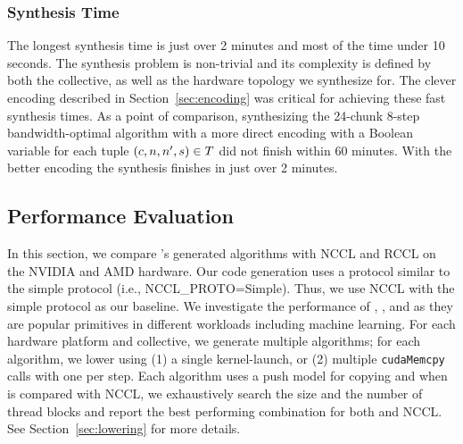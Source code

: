 \subsubsection{Synthesis Time}
The longest synthesis time is just over 2 minutes and most of the time
under 10 seconds.  The synthesis problem is non-trivial and its
complexity is defined by both the collective, as well as the hardware
topology we synthesize for. The clever encoding described in
Section~\ref{sec:encoding} was critical for achieving these fast
synthesis times. As a point of comparison, synthesizing the 24-chunk
8-step bandwidth-optimal \alltoall algorithm with a more direct
encoding with a Boolean variable for each tuple $(c, n, n', s) \in
T$ did not finish within 60 minutes. With the better encoding the
synthesis finishes in just over 2 minutes.

\subsection{Performance Evaluation}
In this section, we compare \tool's generated algorithms with NCCL and
RCCL on the NVIDIA and AMD hardware.  Our code generation uses a
protocol similar to the simple protocol (i.e., NCCL\_PROTO=Simple).
Thus, we use NCCL with the simple protocol as our baseline. We
investigate the performance of \allgather, \allreduce, and \alltoall
as they are popular primitives in different workloads including
machine learning. For each hardware platform and collective, we
generate multiple algorithms; for each algorithm, we lower using (1) a
single kernel-launch, or (2) multiple \texttt{cudaMemcpy} calls with
one per step. Each algorithm uses a push model for copying and when
\tool{} is compared with NCCL, we exhaustively search the size and the
number of thread blocks and report the best performing combination for
both \tool{} and NCCL. See Section~\ref{sec:lowering} for more
details.

